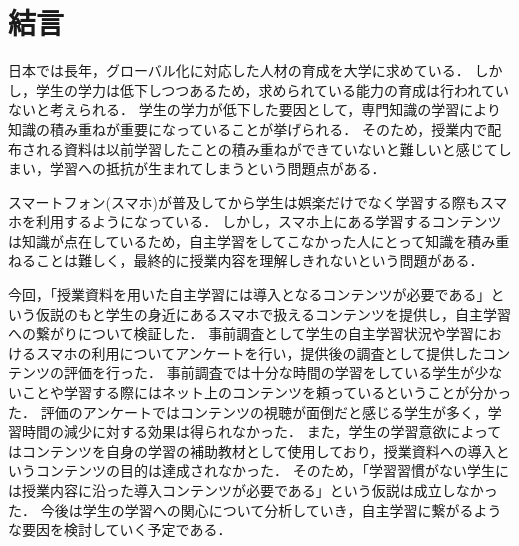 \documentclass[12pt,a4j,titlepage]{ltjsarticle}
\begin{document}
\clearpage

\section{結言}
日本では長年，グローバル化に対応した人材の育成を大学に求めている\cite{monka1}．
しかし，学生の学力は低下しつつあるため，求められている能力の育成は行われていないと考えられる．
学生の学力が低下した要因として，専門知識の学習により知識の積み重ねが重要になっていることが挙げられる．
そのため，授業内で配布される資料は以前学習したことの積み重ねができていないと難しいと感じてしまい，学習への抵抗が生まれてしまうという問題点がある．

スマートフォン(スマホ)が普及してから学生は娯楽だけでなく学習する際もスマホを利用するようになっている．
しかし，スマホ上にある学習するコンテンツは知識が点在しているため，自主学習をしてこなかった人にとって知識を積み重ねることは難しく，最終的に授業内容を理解しきれないという問題がある．

今回，「授業資料を用いた自主学習には導入となるコンテンツが必要である」という仮説のもと学生の身近にあるスマホで扱えるコンテンツを提供し，自主学習への繋がりについて検証した．
事前調査として学生の自主学習状況や学習におけるスマホの利用についてアンケートを行い，提供後の調査として提供したコンテンツの評価を行った．
事前調査では十分な時間の学習をしている学生が少ないことや学習する際にはネット上のコンテンツを頼っているということが分かった．
評価のアンケートではコンテンツの視聴が面倒だと感じる学生が多く，学習時間の減少に対する効果は得られなかった．
また，学生の学習意欲によってはコンテンツを自身の学習の補助教材として使用しており，授業資料への導入というコンテンツの目的は達成されなかった．
そのため，「学習習慣がない学生には授業内容に沿った導入コンテンツが必要である」という仮説は成立しなかった．
今後は学生の学習への関心について分析していき，自主学習に繋がるような要因を検討していく予定である．

\clearpage
\end{document}
